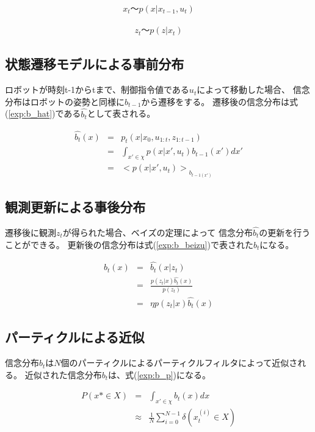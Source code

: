 \begin{eqnarray}
  \label{exp:u_m}
  x_t 〜 p(x|x_{t-1}, u_t)
\end{eqnarray}

\begin{eqnarray}
  \label{exp:z_m}
  z_t 〜 p(z|x_t)
\end{eqnarray}

\subsection{状態遷移モデルによる事前分布}

ロボットが時刻t-1からtまで、制御指令値である$u_t$によって移動した場合、
信念分布はロボットの姿勢と同様に$b_{t-1}$から遷移をする。
遷移後の信念分布は式(\ref{exp:b_hat})である$\hat{b_t}$として表される。

\begin{eqnarray}
  \label{exp:b_hat}
  \hat{b_t}(x) &=& p_t(x|x_0, u_{1:t}, z_{1:t-1}) \nonumber \\
  &=& \int_{x'\in\chi} p(x|x', u_t)b_{t-1}(x')dx' \nonumber \\
  &=& {<p(x|x', u_t)>}_{b_{t-1(x')}}
\end{eqnarray}

\subsection{観測更新による事後分布}

遷移後に観測$z_t$が得られた場合、ベイズの定理によって
信念分布$\hat{b_t}$の更新を行うことができる。
更新後の信念分布は式(\ref{exp:b_beizu})で表された$b_t$になる。

\begin{eqnarray}
  \label{exp:b_beizu}
  b_t(x) &=& \hat{b_t}(x|z_t) \nonumber \\
  &=& \frac{p(z_t|x)\hat{b_t}(x)}{p(z_t)} \nonumber \\
  &=& \eta p(z_t|x)\hat{b_t}(x)
\end{eqnarray}

\subsection{パーティクルによる近似}

信念分布$b_t$は$N$個のパーティクルによるパーティクルフィルタによって近似される。
近似された信念分布$b_t$は、式(\ref{exp:b_p})になる。

\begin{eqnarray}
  \label{exp:b_p}
  P(x*\in X) &=& \int_{x'\in\chi}b_t(x)dx \nonumber \\
  &\approx& \frac{1}{N} \sum_{i=0}^{N-1} \delta (x^{(i)}_{t} \in X)
\end{eqnarray}


